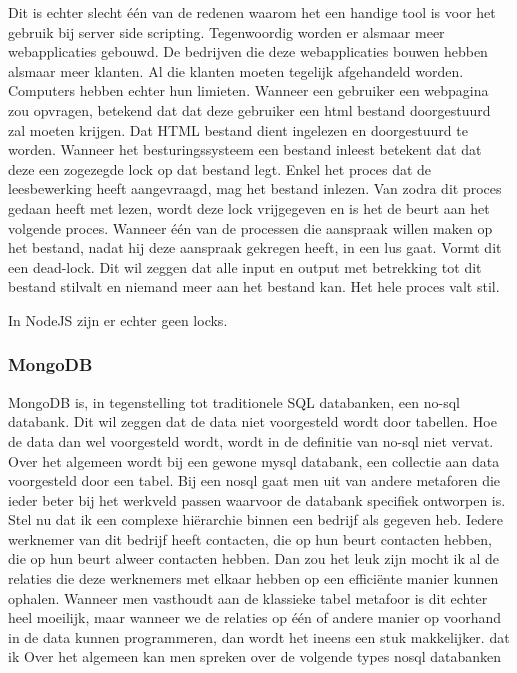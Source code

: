 \documentclass[a4paper,11pt]{article}
\begin{document}
Dit is echter slecht één van de redenen waarom het een handige tool is voor het gebruik bij server side scripting. Tegenwoordig worden er alsmaar meer webapplicaties gebouwd. De bedrijven die deze webapplicaties bouwen hebben alsmaar meer klanten. Al die klanten moeten tegelijk afgehandeld worden. Computers hebben echter hun limieten. Wanneer een gebruiker een webpagina zou opvragen, betekend dat dat deze gebruiker een html bestand doorgestuurd zal moeten krijgen. Dat HTML bestand dient ingelezen en doorgestuurd te worden. Wanneer het besturingssysteem een bestand inleest betekent dat dat deze een zogezegde lock op dat bestand legt. Enkel het proces dat de leesbewerking heeft aangevraagd, mag het bestand inlezen. Van zodra dit proces gedaan heeft met lezen, wordt deze lock vrijgegeven en is het de beurt aan het volgende proces. Wanneer één van de processen die aanspraak willen maken op het bestand, nadat hij deze aanspraak gekregen heeft, in een lus gaat. Vormt dit een dead-lock. Dit wil zeggen dat alle input en output met betrekking tot dit bestand stilvalt en niemand meer aan het bestand kan. Het hele proces valt stil.

In NodeJS zijn er echter geen locks.

\subsubsection{MongoDB}
MongoDB is, in tegenstelling tot traditionele SQL databanken, een 
no-sql databank. Dit wil zeggen dat de data niet voorgesteld wordt door 
tabellen. Hoe de data dan wel voorgesteld wordt, wordt in de definitie 
van no-sql niet vervat. Over het algemeen wordt bij een gewone mysql 
databank, een collectie aan data voorgesteld door een tabel. Bij een 
nosql gaat men uit van andere metaforen die ieder beter bij het 
werkveld passen waarvoor de databank specifiek ontworpen is. Stel nu 
dat ik een complexe hiërarchie binnen een bedrijf als gegeven heb. 
Iedere werknemer van dit bedrijf heeft contacten, die op hun beurt 
contacten hebben, die op hun beurt alweer contacten hebben. Dan zou 
het leuk zijn mocht ik al de relaties die deze werknemers met elkaar 
hebben op een efficiënte manier kunnen ophalen. Wanneer men vasthoudt 
aan de klassieke tabel metafoor is dit echter heel moeilijk, maar 
wanneer we de relaties op één of andere manier op voorhand in de data 
kunnen programmeren, dan wordt het ineens een stuk makkelijker.
dat ik  Over het algemeen kan men spreken over de 
volgende types nosql databanken
\end{document}
